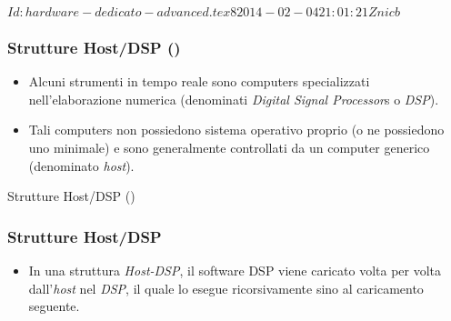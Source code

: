 %
%
%
%
%
\svnInfo $Id: hardware-dedicato-advanced.tex 8 2014-02-04 21:01:21Z nicb $

\setcounter{ms}{1}
\begin{frame}
    \frametitle{Strutture Host/DSP ()}

		\begin{itemize}[<+- | alert@+->]
		\setlength{\itemsep}{12mm}

			\item Alcuni strumenti in tempo reale sono
                  computers specializzati nell'elaborazione numerica
                  (denominati \emph{Digital Signal Processor}s
                  o \emph{DSP}).

		    \item Tali computers non possiedono sistema
				  operativo proprio (o ne possiedono uno minimale)
				  e sono generalmente controllati da un
				  computer generico (denominato \emph{host}).

		\end{itemize}

\end{frame}

\begin{frame}{Strutture Host/DSP ()}

	\begin{center}
	\end{center}

\end{frame}

\begin{frame}
    \frametitle{Strutture Host/DSP}

	\begin{itemize}[<+- | alert@+->]

		\item In una struttura \emph{Host-DSP},
			  il software DSP viene caricato volta per volta
			  dall'\emph{host} nel \emph{DSP},
			  il quale lo esegue ricorsivamente
			  sino al caricamento seguente.

	\end{itemize}


\end{frame}

